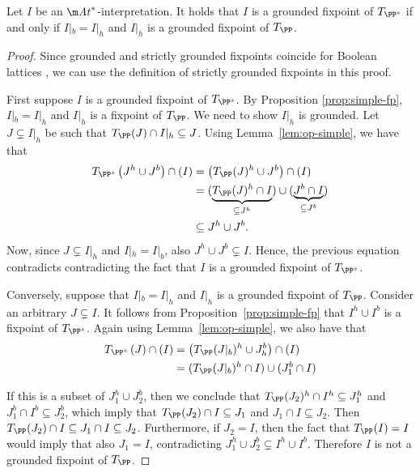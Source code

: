 \begin{proposition}
  \label{prop:simple-gf}
    Let $I$ be an $\atoms^*$-interpretation. It holds that $I$ is a grounded fixpoint of  $T_{\PP^s}$ if and only if $I|_b=I|_h$ and $I|_h$ is a grounded fixpoint of $T_\PP$.
\end{proposition}
\begin{proof}
  Since grounded and strictly grounded fixpoints coincide for Boolean lattices , we can use the definition  of strictly grounded fixpoints in this proof.

  First suppose $I$ is a grounded fixpoint of $T_{\PP^s}$.
  By Proposition \ref{prop:simple-fp}, $I|_b=I|_h$ and $I|_h$ is a fixpoint of $T_\PP$. We need to show $I|_h$ is grounded. 
  Let $J\subsetneq I|_h$ be such that $T_\PP(J)\cap I|_h\subseteq J$.
  Using Lemma~\ref{lem:op-simple}, we have that
  \begin{align*}
    T_{\PP^s}\left(J^h\cup J^b\right)\cap\left(I\right) &=
    \left(T_\PP(J)^h\cup J^b\right)\cap\left(I\right) \\
    &= (\underbrace{T_\PP(J)^h\cap I}_{\subseteq J^h})\cup(\underbrace{J^b\cap I}_{\subseteq J^b}) \\
    &\subseteq J^h\cup J^b.   
  \end{align*}
  Now, since $J\subsetneq I|_h$ and $I|_h=I|_b$, also $J^h\cup J^b \subsetneq I$. Hence, the previous equation contradicts contradicting the fact that $I$ is a grounded fixpoint of $T_{\PP^s}$.

  Conversely, suppose that $I|_b=I|_h$ and $I|_h$ is a grounded fixpoint of $T_\PP$. 
  Consider an arbitrary $J\subsetneq I$. 
  It follows from Proposition~\ref{prop:simple-fp} that $I^h\cup I^b$ is a fixpoint of $T_{\PP^s}$.
  Again using Lemma~\ref{lem:op-simple}, we also have that
  \begin{align*}
    T_{\PP^s}\left(J\right)\cap\left(I\right) &=
    \left(T_\PP(J|_b)^h\cup J_h^b\right)\cap\left(I\right) \\
    &= (T_\PP(J|_b)^h\cap I)\cup(J_1^b\cap I)
  \end{align*}

  If this is a subset of $J_1^h\cup J_2^b$, then we conclude that $T_\PP(J_2)^h\cap I^h\subseteq J_1^h$ and $J_1^b\cap I^b\subseteq J_2^b$, which imply that
  $T_\PP(J_2)\cap I\subseteq J_1$ and $J_1\cap I\subseteq J_2$.
  Then $T_\PP(J_2)\cap I\subseteq J_1\cap I\subseteq J_2$.
  Furthermore, if $J_2=I$, then the fact that $T_\PP(I)=I$ would imply that also $J_1=I$, contradicting $J_1^h\cup J_2^b\subsetneq I^h\cup I^b$.
  Therefore $I$ is not a grounded fixpoint of $T_\PP$.
\end{proof}

